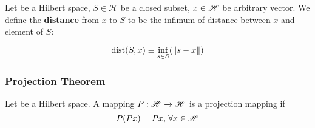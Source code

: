 \documentclass{article}
\begin{document}
\begin{definition}\rm\nextline
	Let \hbs be a Hilbert space, $S\in \mathscr{H}$ be a closed subset, $x\in \mathscr{H}$ be arbitrary vector. We define the {\bf{distance}} from $x$ to $S$ to be the infimum of distance between $x$ and element of $S$:

	$$\text{dist}(S,x)\equiv\inf_{s\in S} (\left\|{s-x}\right\|)$$

\end{definition}




\subsubsection{Projection Theorem}
\begin{definition}\rm\nextline
	Let \hbs be a Hilbert space. A mapping $P:\mathscr{H}\xrightarrow{}\mathscr{H}$ is a projection mapping if $$
		P(Px)=Px,\,\forall x\in\mathscr{H}
	$$


\end{definition}
\end{document}
